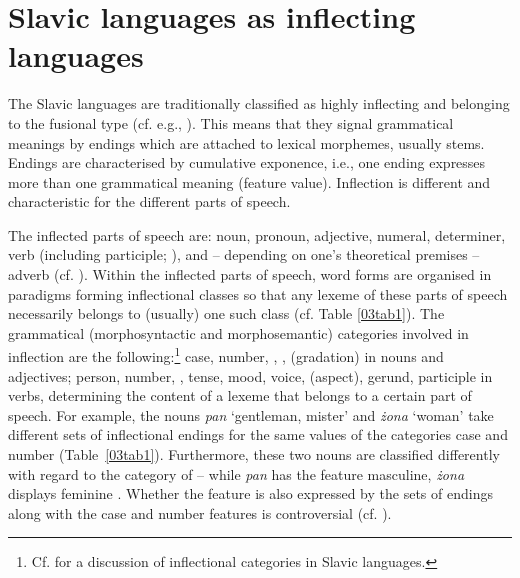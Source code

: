 \documentclass[output=paper,colorlinks,citecolor=brown]{langscibook}
\begin{document}
\section{Slavic languages as inflecting languages} \label{03sec2}

The Slavic languages are traditionally classified as highly inflecting and belonging to the fusional type (cf. e.g., \citealt[6]{comriecorbett1993-intro}). This means that they signal grammatical meanings by endings which are attached to lexical morphemes, usually stems. Endings are characterised by cumulative exponence, i.e., one ending expresses more than one grammatical meaning (feature value). Inflection is different and characteristic for the different parts of speech.

The inflected parts of speech are: noun, pronoun, adjective, numeral, determiner, verb (including participle; \citealt[222]{sussexcubberley2006}), and -- depending on one's theoretical premises -- adverb (cf. \citealt[743]{nagorko2009}). Within the inflected parts of speech, word forms are organised in paradigms forming inflectional classes so that any lexeme of these parts of speech necessarily belongs to (usually) one such class (cf. Table \ref{03tab1}). The grammatical (morphosyntactic and morphosemantic) categories involved in inflection are the following:\footnote{Cf. \citet{spencerwiemer2020} for a discussion of inflectional categories in Slavic languages.} case, number, , , (gradation) in nouns and adjectives; person, number, , tense, mood, voice, (aspect), gerund, participle in verbs, determining the content  of a lexeme that belongs to a certain part of speech. For example, the  nouns \emph{pan} `gentleman, mister' and \emph{żona} `woman' take different sets of inflectional endings for the same values of the categories case and number (Table~\ref{03tab1}). Furthermore, these two nouns are classified differently with regard to the category of  -- while \emph{pan} has the feature masculine, \emph{żona} displays feminine . Whether the  feature is also expressed by the sets of endings along with the case and number features is controversial (cf. \citealt[148]{doleschal2009}).
\end{document}
